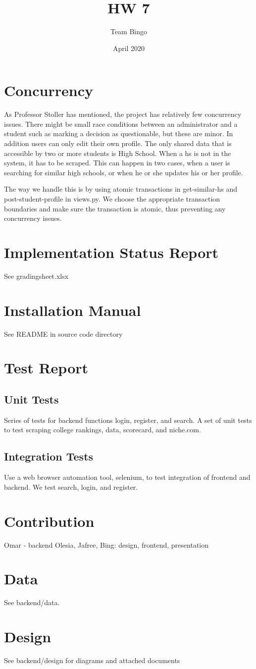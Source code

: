\documentclass{article}
\title{HW 7}
\author{Team Bingo}
\date{April 2020}
\begin{document}
\maketitle

\section{Concurrency}
As Professor Stoller has mentioned, the project has relatively few concurrency
issues. There might be small race conditions between an administrator and a
student such as marking a decision as questionable, but these are minor. In
addition users can only edit their own profile. The only shared data that is
accessible by two or more students is High School. When a hs is not in the system, it has to
be scraped. This can happen in two cases, when a user is searching for similar
high schools, or when he or she updates his or her profile. 

The way we handle this is by using atomic transactions in get-similar-hs and
post-student-profile in views.py. We choose the appropriate transaction
boundaries and make sure the transaction is atomic, thus preventing any
concurrency issues.


\section{Implementation Status Report}
See gradingsheet.xlsx 

\section{Installation Manual}
See README in source code directory

\section{Test Report}
\subsection{Unit Tests}
Series of tests for backend functions login, register, and search.
A set of unit tests to test scraping college rankings, data, scorecard, and
niche.com. 

\subsection{Integration Tests}
Use a web browser automation tool, selenium, to test integration of frontend and
backend. We test search, login, and register.

\section{Contribution}
Omar - backend 
Olesia, Jafree, Bing: design, frontend, presentation

\section{Data}
See backend/data.

\section{Design}
See backend/design for diagrams and attached documents
\end{document}
